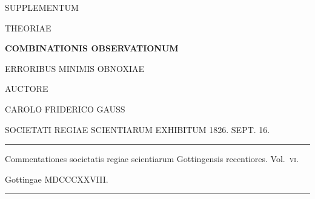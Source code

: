 \clearpage
{}
\thispagestyle{empty}
\begin{center}
\vspace*{2em}
{\Large SUPPLEMENTUM\par}
\bigskip
{\Large THEORIAE\par}
\bigskip
{\Large\bfseries COMBINATIONIS OBSERVATIONUM\par}
\bigskip
{\large ERRORIBUS MINIMIS OBNOXIAE\par}
\bigskip
AUCTORE\par
\bigskip
{\large CAROLO FRIDERICO GAUSS\par}
\bigskip
{\small SOCIETATI REGIAE SCIENTIARUM EXHIBITUM 1826. SEPT. 16.\par}
\bigskip
\rule{.7\linewidth}{.3pt}\par
\bigskip
Commentationes societatis regiae scientiarum Gottingensis recentiores.
\mbox{Vol.~\textsc{vi}.}
\par\medskip
Gottingae MDCCCXXVIII.
\par\bigskip
\rule{.7\linewidth}{.3pt}
\end{center}
\clearpage
\renewcommand{\Article}[1]{\par\medskip\Needspace{4\baselineskip}\pdfbookmark[1]{Art. #1}{supplementum-art-#1}\centerline{\textbf{#1.}}\nobreak\smallskip}
